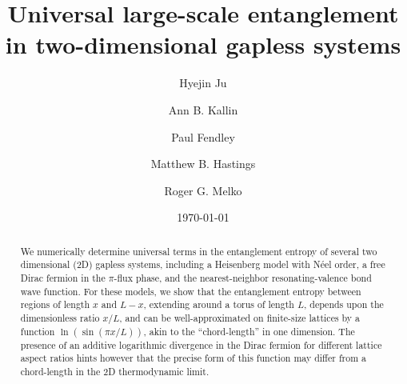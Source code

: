 \documentclass[prl,aps,twocolumn,floatfix,amsmath,amssymb,superscriptaddress,tightenlines]{revtex4}
\begin{document}
\newcommand{\be}{\begin{equation}}
\newcommand{\ee}{\end{equation}}

\date{\today}
\title{Universal large-scale entanglement in
  two-dimensional gapless systems}

\author{Hyejin Ju}

\author{Ann B. Kallin}

\author{Paul Fendley}

\author{Matthew B. Hastings}

\author{Roger G. Melko}

\begin{abstract} 
We numerically determine universal terms in the entanglement entropy of several two dimensional (2D) gapless systems, including a Heisenberg model with N\'eel order, a free Dirac fermion in the $\pi$-flux phase, and the nearest-neighbor resonating-valence bond wave function.
For these models, we show that the entanglement entropy between regions of length $x$ and $L-x$, extending around a torus of
length $L$, depends upon the dimensionless ratio $x/L$, and can be well-approximated on finite-size lattices by a function
$\ln(\sin(\pi x/L))$, akin to the ``chord-length'' in one dimension.
The presence of an additive logarithmic divergence in the Dirac fermion for different lattice aspect ratios hints however that the precise form of this function may differ from a chord-length in the 2D thermodynamic limit.
\end{abstract}
\maketitle
\end{document}
